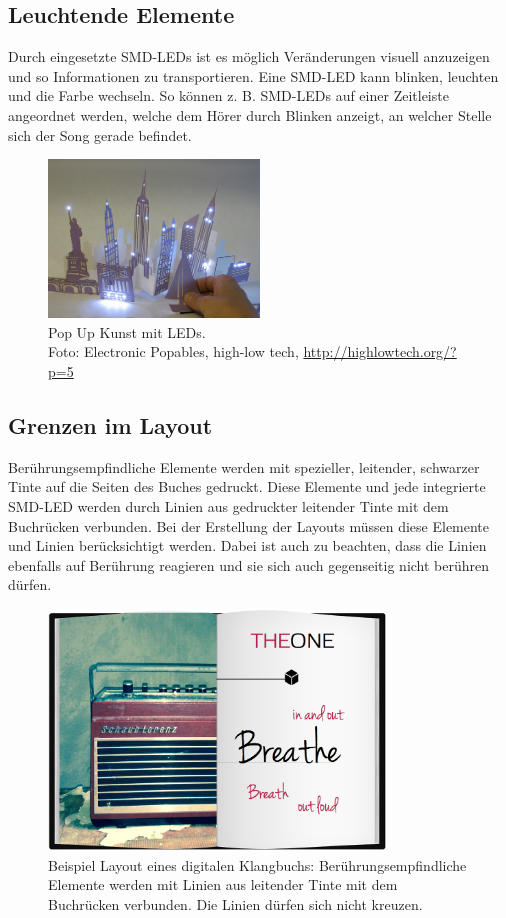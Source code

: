 \subsection{Leuchtende Elemente}
Durch eingesetzte SMD-LEDs ist es möglich Veränderungen visuell anzuzeigen und so Informationen zu transportieren. Eine SMD-LED kann blinken, leuchten und die Farbe wechseln. So können z. B. SMD-LEDs auf einer Zeitleiste angeordnet werden, welche dem Hörer durch Blinken anzeigt, an welcher Stelle sich der Song gerade befindet.


\begin{figure}[H]
\centering
\includegraphics[width=0.5\textwidth]{grafiken/popupled.jpg}
\caption{Pop Up Kunst mit LEDs.\\Foto: Electronic Popables, high-low tech, \url{http://highlowtech.org/?p=5} }
\label{fig:PopupLED}
\end{figure}


\subsection{Grenzen im Layout}
Berührungsempfindliche Elemente werden mit spezieller, leitender, schwarzer Tinte auf die Seiten des Buches gedruckt. Diese Elemente und jede integrierte SMD-LED werden durch Linien aus gedruckter leitender Tinte mit dem Buchrücken verbunden. Bei der Erstellung der Layouts müssen diese Elemente und Linien berücksichtigt werden. Dabei ist auch zu beachten, dass die Linien ebenfalls auf Berührung reagieren und sie sich auch gegenseitig nicht berühren dürfen.

\begin{figure}[H]
\centering
\includegraphics[width=0.8\textwidth]{grafiken/bspklangbuch.png}
\caption{Beispiel Layout eines digitalen Klangbuchs: Berührungsempfindliche Elemente werden mit Linien aus leitender Tinte mit dem Buchrücken verbunden. Die Linien dürfen sich nicht kreuzen.}
\end{figure}




